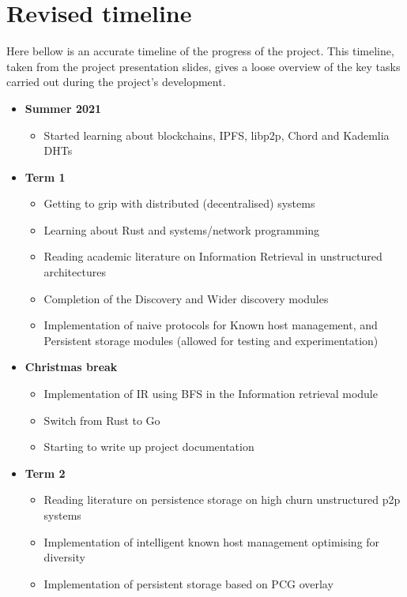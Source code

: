 \chapter{Revised timeline}
\label{actualTimeline}

Here bellow is an accurate timeline of the progress of the project. This timeline, taken from the project presentation slides, gives a loose overview of the key tasks carried out during the project's development.

\begin{itemize}
    \item \textbf{Summer 2021}
          \begin{itemize}
              \item Started learning about blockchains, IPFS, libp2p, Chord and Kademlia DHTs
          \end{itemize}

    \item \textbf{Term 1}
          \begin{itemize}
              \item Getting to grip with distributed (decentralised) systems
              \item Learning about Rust and systems/network programming
              \item Reading academic literature on Information Retrieval in unstructured architectures
              \item Completion of the Discovery and Wider discovery modules
              \item Implementation of naive protocols for Known host management, and Persistent storage modules (allowed for testing and experimentation)
          \end{itemize}

    \item \textbf{Christmas break}
          \begin{itemize}
              \item Implementation of IR using BFS in the Information retrieval module
              \item Switch from Rust to Go
              \item Starting to write up project documentation
          \end{itemize}

    \item \textbf{Term 2}
          \begin{itemize}
              \item Reading literature on persistence storage on high churn unstructured p2p systems
              \item Implementation of intelligent known host management optimising for diversity
              \item Implementation of persistent storage based on PCG overlay
          \end{itemize}
\end{itemize}